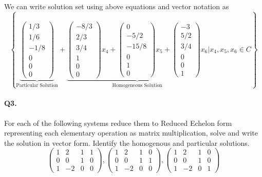 \documentclass[11pt]{article}
\begin{document}
\paragraph{}We can write solution set using above equations and vector notation as
\[
\left\{
\underbrace{
\begin{pmatrix}
1/3\\
1/6\\
-1/8\\
0\\
0\\
0
\end{pmatrix}
}_\text{Particular Solution}
+
\underbrace{
\begin{pmatrix}
-8/3\\
2/3\\
3/4\\
1\\
0\\
0
\end{pmatrix}x_4+
\begin{pmatrix}
0\\
-5/2\\
-15/8\\
0\\
1\\
0
\end{pmatrix}x_5
+
\begin{pmatrix}
-3\\
5/2\\
3/4\\
0\\
0\\
1
\end{pmatrix}x_6}_\text{Homogeneous Solution}
| x_4,x_5,x_6 \in C
\right\}
\]
\paragraph{Q3.}For each of the following systems reduce them to Reduced Echelon form representing each elementary operation as matrix multiplication, solve and write the solution in vector form. Identify the homogenous and particular solutions.
\[
\left(\begin{array}{ccc|c}  
	1 & 2 & 1 & 1 \\
    0 & 0 & 1 & 0 \\
    1 & -2 & 0 & 0
\end{array}\right),
\left(\begin{array}{ccc|c}  
	1 & 2 & 1 & 0 \\
    0 & 0 & 1 & 1 \\
    1 & -2 & 0 & 0
\end{array}\right),
\left(\begin{array}{ccc|c}  
	1 & 2 & 1 & 0 \\
    0 & 0 & 1 & 0 \\
    1 & -2 & 0 & 1
\end{array}\right)
\]
\end{document}
